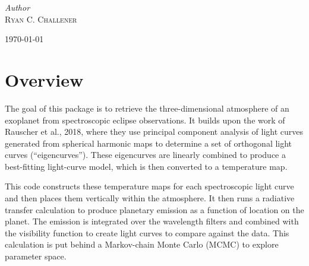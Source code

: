 \documentclass[12pt]{article}
\begin{document}
\begin{titlepage}
	{\large\textit{Author}}\\
	\textsc{Ryan C. Challener} %
	
	
	\vfill\vfill\vfill %
	
	{\large\today} %
	
	
	 
	
	\vfill %
	
\end{titlepage}

\section{Overview}

The goal of this package is to retrieve the three-dimensional atmosphere 
of an exoplanet from spectroscopic eclipse observations. It builds upon
the work of Rauscher et al., 2018, where they use principal component
analysis of light curves generated from spherical harmonic maps to
determine a set of orthogonal light curves (``eigencurves''). These
eigencurves are linearly combined to produce a best-fitting light-curve
model, which is then converted to a temperature map.

This code constructs these temperature maps for each spectroscopic
light curve and then places them vertically within the atmosphere. It
then runs a radiative transfer calculation to produce planetary
emission as a function of location on the planet. The emission is
integrated over the wavelength filters and combined with the visibility
function to create light curves to compare against the data. This
calculation is put behind a Markov-chain Monte Carlo (MCMC) to explore
parameter space.
\end{document}
